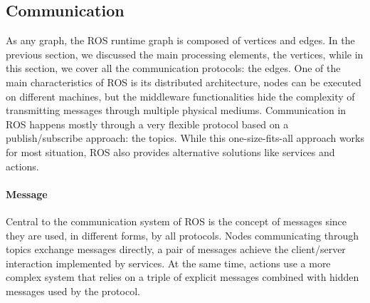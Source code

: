 \subsection{Communication}
As any graph, the ROS runtime graph is composed of vertices and edges. In the previous section, we discussed the main processing elements, the vertices, while in this section, we cover all the communication protocols: the edges. One of the main characteristics of ROS is its distributed architecture, nodes can be executed on different machines, but the middleware functionalities hide the complexity of transmitting messages through multiple physical mediums. Communication in ROS happens mostly through a very flexible protocol based on a publish/subscribe approach: the topics. While this one-size-fits-all approach works for most situation, ROS also provides alternative solutions like services and actions.

\paragraph{Message} Central to the communication system of ROS is the concept of messages since they are used, in different forms, by all protocols. Nodes communicating through topics exchange messages directly, a pair of messages achieve the client/server interaction implemented by services. At the same time, actions use a more complex system that relies on a triple of explicit messages combined with hidden messages used by the protocol.

